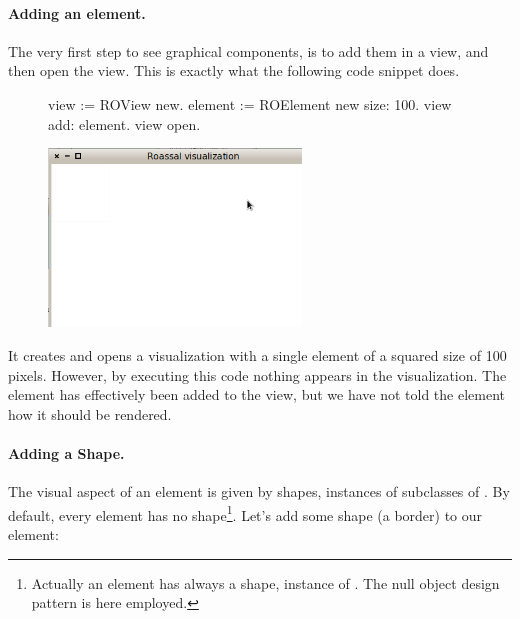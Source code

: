 \documentclass[a4paper,10pt,twoside]{book}
\begin{document}
\paragraph{Adding an element.} The very first step to see graphical components, is to add them in a view, and then open the view. This is exactly what the following code snippet does.

\begin{figure}[H]
      \begin{minipage}[t]{0.5\textwidth}
      \vspace{0pt}
\begin{code}{}
view := ROView new.
element := ROElement new size: 100.
view add: element.
view open.
\end{code}
   \end{minipage}
   \hfill
   \begin{minipage}[t]{0.6\textwidth}
      \vspace{0pt} \raggedright
       \centering
		\includegraphics[width=0.6\textwidth]{ex1}
   \end{minipage}
\label{fig:ex1}
\end{figure}

It creates and opens a visualization with a single element of a squared size of 100 pixels. However, by executing this code nothing appears in the visualization. The element has effectively been added to the view, but we have not told the element how it should be rendered. 

\paragraph{Adding a Shape.} The visual aspect of an element is given by shapes, instances of subclasses of . By default, every element has no shape\footnote{Actually an element has always a shape, instance of . The null object design pattern is here employed.}. Let's add some shape (a border) to our element: 
\end{document}
